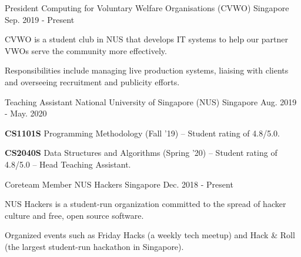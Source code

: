 

\begin{cventries}

  \cventry
    {President} %
    {Computing for Voluntary Welfare Organisations (CVWO)} %
    {Singapore} %
    {Sep. 2019 - Present} %
    {
      \begin{cvitems} %
        \item {CVWO is a student club in NUS that develops IT systems to help our partner VWOs serve the community more effectively.}
        \item {Responsibilities include managing live production systems, liaising with clients and overseeing recruitment and publicity efforts.}
      \end{cvitems}
    }

  \cventry
    {Teaching Assistant} %
    {National University of Singapore (NUS)} %
    {Singapore} %
    {Aug. 2019 - May. 2020} %
    {
      \begin{cvitems} %
        \item {\textbf{CS1101S} Programming Methodology (Fall '19) – Student rating of 4.8/5.0.}
        \item {\textbf{CS2040S} Data Structures and Algorithms (Spring '20) – Student rating of 4.8/5.0 – Head Teaching Assistant.}
      \end{cvitems}
    }

\cventry
{Coreteam Member} %
{NUS Hackers} %
{Singapore} %
{Dec. 2018 - Present} %
{
  \begin{cvitems} %
    \item {NUS Hackers is a student-run organization committed to the spread of hacker culture and free, open source software.}
    \item {Organized events such as Friday Hacks (a weekly tech meetup) and Hack \& Roll (the largest student-run hackathon in Singapore).}
  \end{cvitems}
}

\end{cventries}
